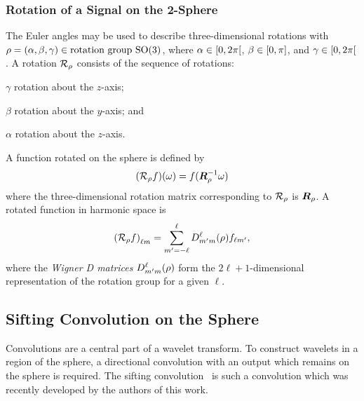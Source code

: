 \subsubsection{Rotation of a Signal on the 2-Sphere}

The Euler angles may be used to describe three-dimensional rotations with \(\rho = (\alpha,\beta,\gamma) \in \text{rotation group } \text{SO(3)}{}\), where \(\alpha \in \interval[open right]{0}{2\pi}\), \(\beta \in \interval{0}{\pi}\), and \(\gamma \in \interval[open right]{0}{2\pi}\).
A rotation \(\mathcal{R}_{\rho}\) consists of the sequence of rotations:
%
\begin{inparaenum}[(i)]
	\item \({\gamma}\) rotation about the \(z\)-axis;
	\item \({\beta}\) rotation about the \(y\)-axis; and
	\item \({\alpha}\) rotation about the \(z\)-axis.
\end{inparaenum}
%
A function rotated on the sphere is defined by
%
\begin{equation}
	(\mathcal{R}_{\rho}f)(\omega)
	= f(\vb*{R}_{\rho}^{-1} \omega)
\end{equation}
%
where the three-dimensional rotation matrix corresponding to \(\mathcal{R}_{\rho}\) is \(\vb*{R}_{\rho}\).
A rotated function in harmonic space is
%
\begin{equation}
	{(\mathcal{R}_{\rho}f)}_{\ell m}
	= \sum\limits_{m'=-\ell}^{\ell} D^{\ell}_{m'm}(\rho) f_{\ell m'},
\end{equation}
%
where the \emph{Wigner D matrices} \(D^{\ell}_{m'm}(\rho)\) form the \(2\ell+1\)-dimensional representation of the rotation group for a given \({\ell}\).

\subsection{Sifting Convolution on the Sphere}\label{sec:chapter3_sifting_convolution_sphere}

Convolutions are a central part of a wavelet transform.
To construct wavelets in a region of the sphere, a directional convolution with an output which remains on the sphere is required.
The sifting convolution~\cite{Roddy2021} is such a convolution which was recently developed by the authors of this work.

